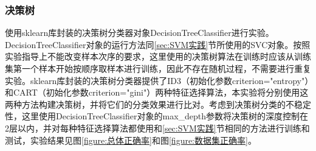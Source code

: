 \documentclass[a4paper]{ctexart}
\begin{document}
\subsubsection{决策树}\label{sec:DT实践}
使用sklearn库封装的决策树分类器对象DecisionTreeClassifier进行实验。DecisionTreeClassifier对象的运行方法同\ref{sec:SVM实践}节所使用的SVC对象。按照实验指导上不能改变样本次序的要求，这里使用的决策树算法在训练时应该从训练集第一个样本开始按顺序取样本进行训练，因此不存在随机过程，不需要进行重复实验。sklearn库封装的决策树分类器提供了ID3（初始化参数criterion="entropy"）和CART（初始化参数criterion="gini"）两种特征选择算法，本实验将分别使用这两种方法构建决策树，并将它们的分类效果进行比对。考虑到决策树分类的不稳定性，这里使用DecisionTreeClassifier对象的max\_depth参数将决策树的深度控制在2层以内，并对每种特征选择算法都使用和\ref{sec:SVM实践}节相同的方法进行训练和测试，实验结果见图\ref{figure:总体正确率}和图\ref{figure:数据集正确率}。
\end{document}
